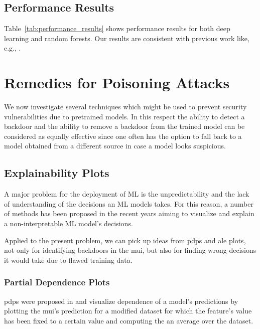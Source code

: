 \documentclass[10pt,sigconf,letterpaper,dvipsnames]{acmart}
\begin{document}
\subsection{Performance Results}
Table~\ref{tab:performance_results} shows performance results for both deep learning and random forests. Our results are consistent with previous work like, e.g., \cite{fares}.

\section{Remedies for Poisoning Attacks}
We now investigate several techniques which might be used to prevent security vulnerabilities due to pretrained models. In this respect the ability to detect a backdoor and the ability to remove a backdoor from the trained model can be considered as equally effective since one often has the option to fall back to a model obtained from a different source in case a model looks suspicious.

\subsection{Explainability Plots} \label{sec:plots}
A major problem for the deployment of ML is the unpredictability and the lack of understanding of the decisions an ML models takes. For this reason, a number of methods has been proposed in the recent years aiming to visualize and explain a non-interpretable ML model's decisions.

Applied to the present problem, we can pick up ideas from \glspl{pdp} and \gls{ale} plots, not only for identifying backdoors in the \gls{mui}, but also for finding wrong decisions it would take due to flawed training data.

\subsubsection{Partial Dependence Plots}
\glspl{pdp} were proposed in \cite{friedman2001greedy} and visualize dependence of a model's predictions by plotting the \gls{mui}'s prediction for a modified dataset for which the feature's value has been fixed to a certain value and computing the an average over the dataset.
\end{document}
